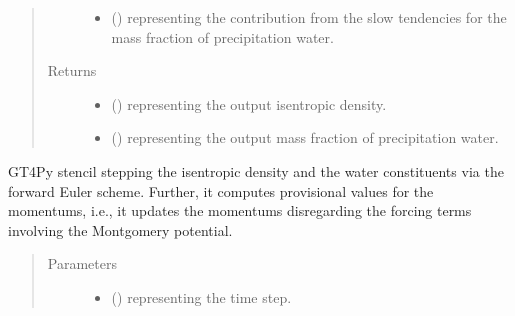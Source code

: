 \documentclass[letterpaper,10pt,english]{sphinxmanual}
\begin{document}
\begin{fulllineitems}
\begin{fulllineitems}
\begin{quote}
\begin{description}
\begin{itemize}
\item {} 
 () \textendash{}  representing the contribution from the slow tendencies for the mass fraction of
precipitation water.

\end{itemize}

\item[{Returns}] \leavevmode
\begin{itemize}
\item {} 
 () \textendash{}  representing the output isentropic density.

\item {} 
 () \textendash{}  representing the output mass fraction of precipitation water.

\end{itemize}


\end{description}\end{quote}

\end{fulllineitems}


\begin{fulllineitems}
\label{\detokenize{api:dycore.prognostic_isentropic_forward_euler.PrognosticIsentropicForwardEuler._stencil_stepping_by_neglecting_vertical_advection_first_defs}}
GT4Py stencil stepping the isentropic density and the water constituents via the forward Euler scheme.
Further, it computes provisional values for the momentums, i.e., it updates the momentums disregarding
the forcing terms involving the Montgomery potential.
\begin{quote}\begin{description}
\item[{Parameters}] \leavevmode\begin{itemize}
\item {} 
 () \textendash{}  representing the time step.


\end{itemize}
\end{description}
\end{quote}
\end{fulllineitems}
\end{fulllineitems}
\end{document}
